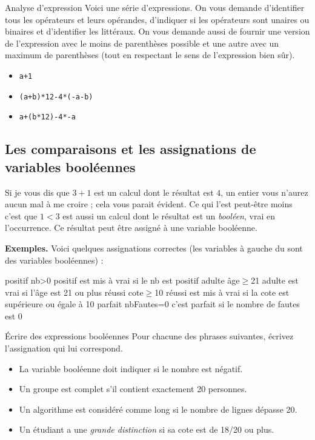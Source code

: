 			\begin{Exercice}{Analyse d'expression}
				Voici une série d'expressions.
				On vous demande d'identifier tous les opérateurs
				et leurs opérandes, 
				d'indiquer si les opérateurs sont unaires ou binaires
				et d'identifier les littéraux.
				On vous demande aussi de fournir une version de l'expression
				avec le moins de parenthèses possible et 
				une autre avec un maximum de parenthèses
				(tout en respectant le sens de l'expression bien sûr).
				\begin{itemize}
				\item \Verb_a+1_
				\item \Verb_(a+b)*12-4*(-a-b)_ 
				\item \Verb_a+(b*12)-4*-a_ 
				\end{itemize}
			\end{Exercice}
			
		\subsection{Les comparaisons et les assignations de variables booléennes}
		
			Si je vous dis que $3+1$ est un calcul
			dont le résultat est $4$, un entier
			vous n'aurez aucun mal à me croire ; 
			cela vous parait évident.
			Ce qui l'est peut-être moins c'est que $1<3$ est aussi
			un calcul dont le résultat est un \emph{booléen},
			vrai en l’occurrence. 
			Ce résultat peut être assigné à une variable booléenne.			

			\textbf{Exemples.}
			Voici quelques assignations correctes 
			(les variables à gauche du \Gets sont des variables booléennes) :
			\begin{LDA}
				\Let positif \Gets nb>0 \RComment positif est mis à vrai si le nb est positif 
				\Let adulte \Gets âge$\ge$21 \RComment adulte est vrai si l'âge est 21 ou plus
				\Let réussi \Gets cote$\ge$10 \RComment réussi est mis à vrai si la cote est supérieure ou égale à 10
				\Let parfait \Gets nbFautes=0 \RComment c'est parfait si le nombre de fautes est 0
			\end{LDA}
		
			\begin{Exercice}{Écrire des expressions booléennes}
				Pour chacune des phrases suivantes,
				écrivez l'assignation qui lui correspond.
				\begin{itemize}
				\item 
					La variable booléenne 
					doit indiquer si le nombre  est négatif.
				\item
					Un groupe est complet s'il contient exactement 20 personnes.
				\item
					Un algorithme est considéré comme long si le nombre de lignes
					dépasse 20.
				\item 
					Un étudiant a une \emph{grande distinction} si sa cote est
					de 18/20 ou plus.
				\end{itemize}
			\end{Exercice}

